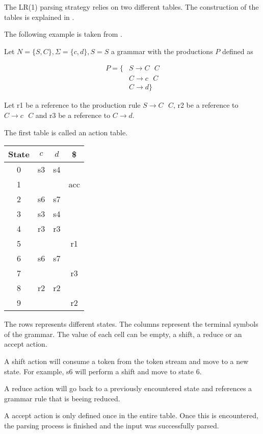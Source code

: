 The LR(1) parsing strategy relies on two different tables. The construction of the tables is explained in \cite{AhoLSU2006}.

The following example is taken from \cite{AhoLSU2006}.

Let $N = \{S, C\}, \Sigma = \{c, d\}, S = S$ a grammar with the productions $P$ defined as

\begin{align}
P = \{&S \rightarrow C\text{ }C\\
&C \rightarrow c\text{ }C\\
&C \rightarrow d\}
\end{align}

Let r1 be a reference to the production rule $S \rightarrow C\text{ }C$, r2 be a reference to $C \rightarrow c\text{ }C$ and r3 be a reference to $C \rightarrow d$.

The first table is called an action table.

\begin{center}
\begin{tabular}{c|ccc}
State & $c$ & $d$ & \$\\
\hline 
0 & s3 & s4 & \\
1 &    &    & acc \\
2 & s6 & s7 & \\
3 & s3 & s4 & \\
4 & r3 & r3 & \\
5 & & & r1\\
6 & s6 & s7 & \\
7 & & & r3\\
8 & r2 & r2 & \\
9 & & & r2
\end{tabular} 
\end{center}


The rows represents different states. The columns represent the terminal symbols of the grammar. The value of each cell can be empty, a shift, a reduce or an accept action. 

A shift action will consume a token from the token stream and move to a new state. For example, s6 will perform a shift and move to state 6.

A reduce action will go back to a previously encountered state and references a grammar rule that is beeing reduced.

A accept action is only defined once in the entire table. Once this is encountered, the parsing process is finished and the input was successfully parsed.

